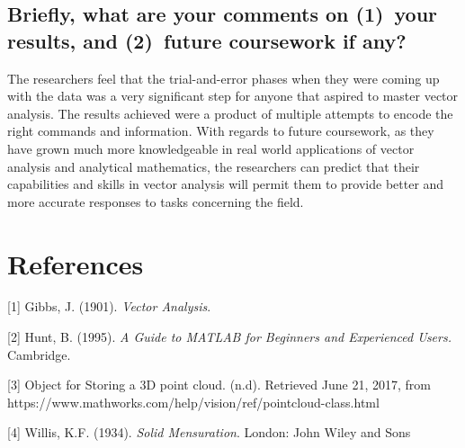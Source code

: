 \subsection{Briefly, what are your comments on (1)~your results, and  (2)~future coursework if any?}
The researchers feel that the trial-and-error phases when they were coming up with the data was a very significant step for anyone that aspired to master vector analysis. The results achieved were a product of multiple attempts to encode the right commands and information. With regards to future coursework, as they have grown much more knowledgeable in real world applications of vector analysis and analytical mathematics, the researchers can predict that their capabilities and skills in vector analysis will permit them to provide better and more accurate responses to tasks concerning the field.



\section{References}
[1] Gibbs, J. (1901). \textit{Vector Analysis}.

[2] Hunt, B. (1995). \textit{A Guide to MATLAB for Beginners and Experienced Users.} Cambridge.

[3] Object for Storing a 3D point cloud. (n.d). Retrieved June 21, 2017, from https://www.mathworks.com/help/vision/ref/pointcloud-class.html

[4] Willis, K.F. (1934). \textit{Solid Mensuration}. London: John Wiley and Sons
\newpage
\begin{figure*}[!t]
\end{figure*}
\cleardoublepage

